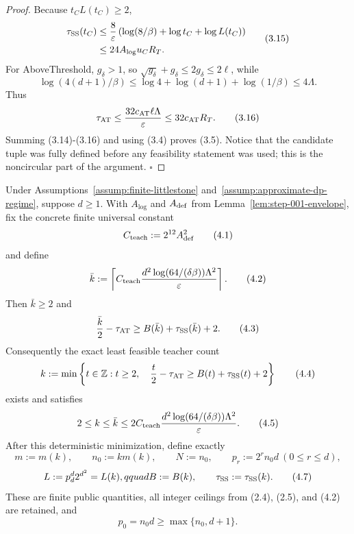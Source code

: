 \begin{proof}
Because \(t_CL(t_C)\ge2\),
\[
\begin{aligned}
\tau_{\rm SS}(t_C)
&\le\frac8\varepsilon
 \left(\log(8/\beta)+\log t_C+\log L(t_C)\right)\\
&\le24A_{\log}u_CR_T.
\end{aligned}
\tag{3.15}
\]
For AboveThreshold, \(g_\delta>1\), so
\(\sqrt{g_\delta}+g_\delta\le2g_\delta\le2\ell\), while
\[
\log(4(d+1)/\beta)
\le\log4+\log(d+1)+\log(1/\beta)\le4\Lambda.
\]
Thus
\[
\tau_{\rm AT}
\le\frac{32c_{\rm AT}\ell\Lambda}{\varepsilon}
\le32c_{\rm AT}R_T.
\tag{3.16}
\]
Summing (3.14)-(3.16) and using (3.4) proves (3.5). Notice that the
candidate tuple was fully defined before any feasibility statement was
used; this is the noncircular part of the argument. \(\square\)


\end{proof}

\begin{proposition}\label{prop:step-001-teacher}
Under Assumptions~\ref{assump:finite-littlestone}
and~\ref{assump:approximate-dp-regime}, suppose \(d\ge1\). With
\(A_{\log}\) and \(A_{\rm def}\) from
Lemma~\ref{lem:step-001-envelope}, fix the concrete finite universal
constant
\[
C_{\rm teach}:=2^{12}A_{\rm def}^2
\tag{4.1}
\]
and define
\[
\bar k:=\left\lceil
C_{\rm teach}
\frac{d^2\log(64/(\delta\beta))\Lambda^2}{\varepsilon}
\right\rceil.
\tag{4.2}
\]
Then \(\bar k\ge2\) and
\[
\frac{\bar k}{2}-\tau_{\rm AT}
\ge B(\bar k)+\tau_{\rm SS}(\bar k)+2.
\tag{4.3}
\]
Consequently the exact least feasible teacher count
\[
k:=\min\left\{t\in\mathbb Z:t\ge2,\quad
\frac t2-\tau_{\rm AT}
\ge B(t)+\tau_{\rm SS}(t)+2\right\}
\tag{4.4}
\]
exists and satisfies
\[
2\le k\le\bar k
\le2C_{\rm teach}
\frac{d^2\log(64/(\delta\beta))\Lambda^2}{\varepsilon}.
\tag{4.5}
\]
After this deterministic minimization, define exactly
\[
m:=m(k),\qquad n_0:=km(k),\qquad N:=n_0,
\qquad p_r:=2^rn_0d\ (0\le r\le d),
\tag{4.6}
\]
\[
L:=p_d^d2^{d^2}=L(k),qquad B:=B(k),
\qquad \tau_{\rm SS}:=\tau_{\rm SS}(k).
\tag{4.7}
\]
These are finite public quantities, all integer ceilings from (2.4), (2.5),
and (4.2) are retained, and
\[
p_0=n_0d\ge\max\{n_0,d+1\}.
\tag{4.8}
\]


\end{proposition}

